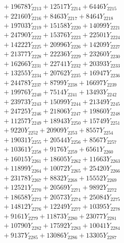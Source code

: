 \documentclass[a4paper,10pt]{article}
\begin{document}
{\begin{align}
&\;  + 19678 Y_{2213} + 12517 Y_{2214} + 6446 Y_{2215} \\[0.3ex]
&\;  + 22160 Y_{2216} + 8463 Y_{2217} + 8464 Y_{2218} \\[0.5ex]\allowbreak
&\;  + 19703 Y_{2219} + 15158 Y_{2220} + 14099 Y_{2221} \\[0.3ex]
&\;  + 24790 Y_{2222} + 15376 Y_{2223} + 22501 Y_{2224} \\[0.3ex]
&\;  + 14222 Y_{2225} + 20996 Y_{2226} + 14209 Y_{2227} \\[0.3ex]
&\;  + 21377 Y_{2228} + 22236 Y_{2229} + 23260 Y_{2230} \\[0.3ex]
&\;  + 16266 Y_{2231} + 22741 Y_{2232} + 20393 Y_{2233} \\[0.3ex]
&\;  + 13255 Y_{2234} + 20762 Y_{2235} + 16947 Y_{2236} \\[0.3ex]
&\;  + 24478 Y_{2237} + 8799 Y_{2238} + 16697 Y_{2239} \\[0.3ex]
&\;  + 19976 Y_{2240} + 7514 Y_{2241} + 13493 Y_{2242} \\[0.3ex]
&\;  + 23973 Y_{2243} + 15099 Y_{2244} + 21349 Y_{2245} \\[0.3ex]
&\;  + 24725 Y_{2246} + 21806 Y_{2247} + 19860 Y_{2248} \\[0.5ex]\allowbreak
&\;  + 11257 Y_{2249} + 18943 Y_{2250} + 15749 Y_{2251} \\[0.3ex]
&\;  + 9220 Y_{2252} + 20909 Y_{2253} + 8557 Y_{2254} \\[0.3ex]
&\;  + 19031 Y_{2255} + 20544 Y_{2256} + 8567 Y_{2257} \\[0.3ex]
&\;  + 10361 Y_{2258} + 9176 Y_{2259} + 6561 Y_{2260} \\[0.3ex]
&\;  + 16015 Y_{2261} + 18605 Y_{2262} + 11663 Y_{2263} \\[0.3ex]
&\;  + 11899 Y_{2264} + 10072 Y_{2265} + 25420 Y_{2266} \\[0.3ex]
&\;  + 23178 Y_{2267} + 8832 Y_{2268} + 15552 Y_{2269} \\[0.3ex]
&\;  + 12521 Y_{2270} + 20569 Y_{2271} + 9892 Y_{2272} \\[0.3ex]
&\;  + 18658 Y_{2273} + 20573 Y_{2274} + 25084 Y_{2275} \\[0.3ex]
&\;  + 14812 Y_{2276} + 12249 Y_{2277} + 10395 Y_{2278} \\[0.5ex]\allowbreak
&\;  + 9161 Y_{2279} + 11873 Y_{2280} + 23077 Y_{2281} \\[0.3ex]
&\;  + 10790 Y_{2282} + 17592 Y_{2283} + 10041 Y_{2284} \\[0.3ex]
&\;  + 9137 Y_{2285} + 13086 Y_{2286} + 13305 Y_{2287} \\[0.3ex]

\end{align}}
\end{document}
